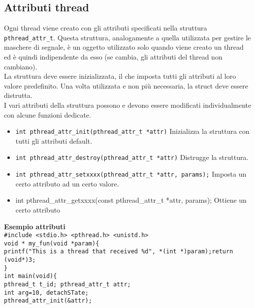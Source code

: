 \begin{flushleft}
  \subsection{Attributi thread}
  \begin{flushleft}
    Ogni thread viene creato con gli attributi specificati nella struttura 
    \texttt{pthread\_attr\_t}. Questa struttura, analogamente a quella utilizzata per gestire le 
    maschere di segnale, è un oggetto utilizzato solo quando viene creato un thread ed è 
    quindi indipendente da esso (se cambia, gli attributi del thread non cambiano).\\
    La struttura deve essere inizializzata, il che imposta tutti gli attributi al loro valore 
    predefinito. Una volta utilizzata e non più necessaria, la struct deve essere distrutta.\\
    I vari attributi della struttura possono e devono essere modificati individualmente 
    con alcune funzioni dedicate.
    \begin{itemize}
      \item \texttt{int pthread\_attr\_init(pthread\_attr\_t *attr)}
      Inizializza la struttura con tutti gli attributi default. 
      \item \texttt{int pthread\_attr\_destroy(pthread\_attr\_t *attr)}
      Distrugge la struttura.
      \item \texttt{int pthread\_attr\_setxxxx(pthread\_attr\_t *attr, params);}
      Imposta un certo attributo ad un certo valore.
      \item int pthread\_attr\_getxxxx(const pthread\_attr\_t *attr, params);
      Ottiene un certo attributo
    \end{itemize}
  \end{flushleft}
  \begin{flushleft}
    \textbf{Esempio attributi}\\
    \texttt{\#include <stdio.h> <pthread.h> <unistd.h> \\
    void * my\_fun(void *param)\{\\
    \halftab printf("This is a thread that received \%d\n", *(int *)param);return (void*)3;\\
    \}\\
    int main(void)\{ \\
    \halftab pthread\_t t\_id; pthread\_attr\_t attr;\\
    \halftab int arg=10, detachSTate;\\
    \halftab pthread\_attr\_init(\&attr);\\
}
\end{flushleft}
\end{flushleft}

